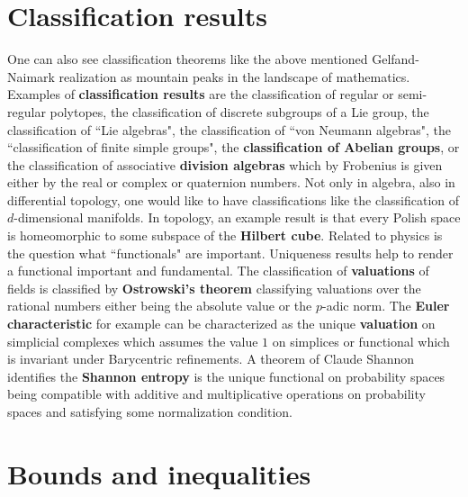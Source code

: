 \documentclass[12pt]{amsart}
\newcounter{example}    \def\example#1{ \item \fontsize{12}{15} \selectfont #1 \fontsize{12}{15} \selectfont }
\begin{document}
\section*{Classification results} 

One can also see classification theorems like the above mentioned 
Gelfand-Naimark realization as mountain peaks in the landscape of mathematics. 
Examples of {\bf classification results} are the classification of regular or 
semi-regular polytopes, the classification of discrete subgroups of a Lie group, 
the classification of ``Lie algebras", the classification of 
``von Neumann algebras", the ``classification of finite simple groups", the {\bf classification of
Abelian groups}, or the classification of associative {\bf division algebras} which by Frobenius is 
given either by the real or complex or quaternion numbers. Not only in algebra, also in 
differential topology, one would like to have classifications like the classification of $d$-dimensional 
manifolds. In topology, an example result is that every Polish space is homeomorphic to 
some subspace of the {\bf Hilbert cube}. Related to physics is the question what 
``functionals" are important. Uniqueness results help to render a functional important and fundamental. 
The classification of {\bf valuations} of fields is classified by {\bf Ostrowski's theorem}
classifying valuations over the rational numbers either being the absolute value or the $p$-adic norm. 
The {\bf Euler characteristic} for example can be characterized as the unique {\bf valuation} 
on simplicial complexes which assumes the value $1$ on simplices or functional which is 
invariant under Barycentric refinements. A theorem of 
Claude Shannon \cite{Shannon48} identifies the {\bf Shannon entropy} is the unique functional 
on probability spaces being compatible with additive and multiplicative operations on 
probability spaces and satisfying some normalization condition. \\

\section*{Bounds and inequalities} 
\end{document}
